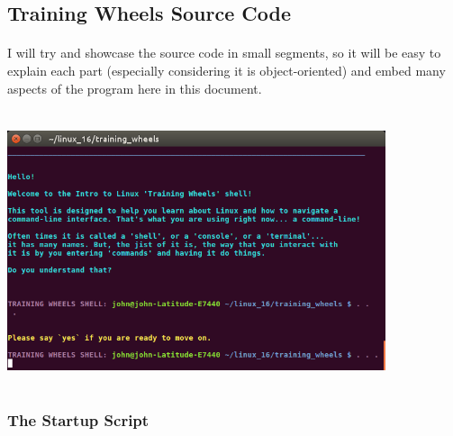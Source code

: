 \documentclass[11pt]{article}
\begin{document}
	\subsection{Training Wheels Source Code} 

	\paragraph{} I will try and showcase the source code in small segments, so it will be easy to explain each part (especially considering it is object-oriented) and embed many aspects of the program here in this document.

	\paragraph{} 

	\begin{center}
		\graphicspath{ {.} }
		\includegraphics[width=420px,height=300px,keepaspectratio]{training_wheels.png}
		\centering
	\end{center}

	\newpage

	\subsubsection{The Startup Script}
\end{document}
